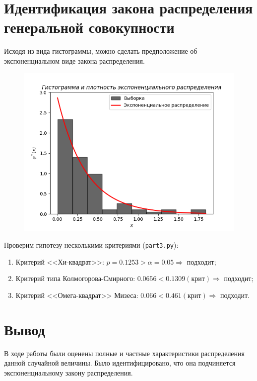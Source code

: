 \documentclass[a4paper,12pt]{article}
\begin{document}
    \section{Идентификация закона распределения генеральной совокупности}
    Исходя из вида гистограммы, можно сделать предположение об экспоненциальном
    виде закона распределения.
    \begin{figure}[H]
        \centering
        \includegraphics[width=0.7\linewidth]{polytech/stats/homework-2/subfiles/fig/3}
    \end{figure}
    Проверим гипотезу несколькими критериями (\texttt{part3.py}):
    \begin{enumerate}
        \item Критерий <<Хи-квадрат>>: $p = 0.1253 > \alpha = 0.05 \Rightarrow$ подходит;
        \item Критерий типа Колмогорова-Смирного: $0.0656 < 0.1309 (\text{крит}) \Rightarrow$ подходит;
        \item Критерий <<Омега-квадрат>> Мизеса: $0.066 < 0.461 (\text{крит}) \Rightarrow$ подходит.
    \end{enumerate}

    \section{Вывод}
    В ходе работы были оценены полные и частные характеристики распределения данной случайной величины.
    Было идентифицировано, что она подчиняется экспоненциальному закону распределения.
    \newpage
\end{document}
